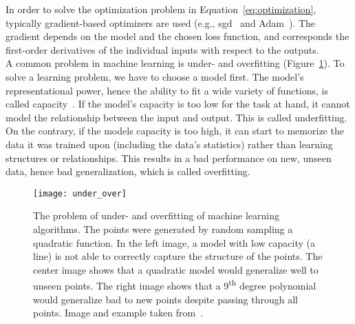 In order to solve the optimization problem in Equation~\ref{eq:optimization}, typically gradient-based optimizers are used (e.g., \gls{sgd}~\cite{Goodfellow2016DeepLearning} and Adam~\cite{Kingma2014Adam:Optimization}). The gradient depends on the model and the chosen loss function, and corresponds the first-order derivatives of the individual inputs with respect to the outputs.\\

A common problem in machine learning is under- and overfitting (Figure~\ref{fig:under_over_fitting}). To solve a learning problem, we have to choose a model first. The model's representational power, hence the ability to fit a wide variety of functions, is called capacity~\cite{Goodfellow2016DeepLearning}. If the model's capacity is too low for the task at hand, it cannot model the relationship between the input and output. This is called underfitting. On the contrary, if the models capacity is too high, it can start to memorize the data it was trained upon (including the data's statistics) rather than learning structures or relationships. This results in a bad performance on new, unseen data, hence bad generalization, which is called overfitting.

\begin{figure}[htbp]
    \centering
	\texttt{[image: under\_over]}
    \caption[Under- and Overfitting]{The problem of under- and overfitting of machine learning algorithms. The points were generated by random sampling a quadratic function. In the left image, a model with low capacity (a line) is not able to correctly capture the structure of the points. The center image shows that a quadratic model would generalize well to unseen points. The right image shows that a 9\textsuperscript{th} degree polynomial would generalize bad to new points despite passing through all points. Image and example taken from~\cite{Goodfellow2016DeepLearning}.}
    \label{fig:under_over_fitting}
\end{figure}

